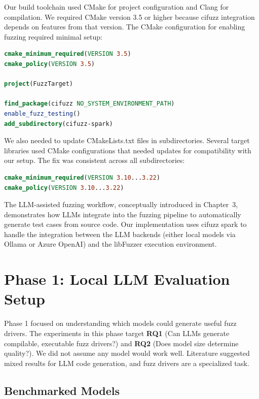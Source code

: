 Our build toolchain used CMake for project configuration and Clang for compilation. We required CMake version 3.5 or higher because cifuzz integration depends on features from that version. The CMake configuration for enabling fuzzing required minimal setup:

\begin{lstlisting}[language=cmake, caption={CMake Fuzzing Configuration}]
cmake_minimum_required(VERSION 3.5)
cmake_policy(VERSION 3.5)

project(FuzzTarget)

find_package(cifuzz NO_SYSTEM_ENVIRONMENT_PATH)
enable_fuzz_testing()
add_subdirectory(cifuzz-spark)
\end{lstlisting}

We also needed to update CMakeLists.txt files in subdirectories. Several target libraries used CMake configurations that needed updates for compatibility with our setup. The fix was consistent across all subdirectories:

\begin{lstlisting}[language=cmake, caption={Subdirectory CMake Updates}]
cmake_minimum_required(VERSION 3.10...3.22)
cmake_policy(VERSION 3.10...3.22)
\end{lstlisting}

The LLM-assisted fuzzing workflow, conceptually introduced in Chapter~3, demonstrates how LLMs integrate into the fuzzing pipeline to automatically generate test cases from source code. Our implementation uses cifuzz spark to handle the integration between the LLM backends (either local models via Ollama or Azure OpenAI) and the libFuzzer execution environment.

\section{Phase 1: Local LLM Evaluation Setup}
\label{sec:impl_phase1}

Phase 1 focused on understanding which models could generate useful fuzz drivers. The experiments in this phase target \textbf{RQ1} (Can LLMs generate compilable, executable fuzz drivers?) and \textbf{RQ2} (Does model size determine quality?). We did not assume any model would work well. Literature suggested mixed results for LLM code generation, and fuzz drivers are a specialized task.

\subsection{Benchmarked Models}


